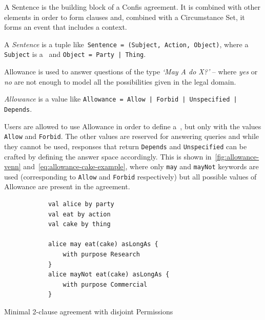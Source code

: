 A Sentence is the building block of a Confis agreement.
It is combined with other elements in order to form clauses and, combined with a Circumstance Set, it forms an event that includes a context.

\begin{definition}[Sentence]
    \label{def:sentence}
    A \emph{Sentence} is a tuple like~\texttt{Sentence = (Subject, Action, Object)}, where a \texttt{Subject} is a~ and \texttt{Object = Party | Thing}.
\end{definition}

Allowance is used to answer questions of the type \emph{`May A do X?'} -- where \emph{yes} or \emph{no} are not enough to model all the possibilities given in the legal domain.


\begin{definition}[Allowance]
    \label{def:allowance}
    \emph{Allowance} is a value like \texttt{Allowance = Allow | Forbid | Unspecified | Depends}.
\end{definition}

Users are allowed to use Allowance in order to define a~, but only with the values \texttt{Allow} and \texttt{Forbid}.
The other values are reserved for answering queries and while they cannot be used, responses that return \texttt{Depends} and \texttt{Unspecified} can be crafted by defining the answer space accordingly.
This is shown in~\autoref{fig:allowance-venn} and~\autoref{eq:allowance-cake-example}, where only \texttt{may} and \texttt{mayNot} keywords are used (corresponding to \texttt{Allow} and \texttt{Forbid} respectively) but all possible values of Allowance are present in the agreement.

\begin{listing}[h]
    \centering
    \begin{minipage}{0.5\textwidth}
        \begin{verbatim}
            val alice by party
            val eat by action
            val cake by thing

            alice may eat(cake) asLongAs {
                with purpose Research
            }
            alice mayNot eat(cake) asLongAs {
                with purpose Commercial
            }
        \end{verbatim}
    \end{minipage}
    \caption{Minimal 2-clause agreement with disjoint Permissions}
    \label{list:disjoint-confis}

\end{listing}


